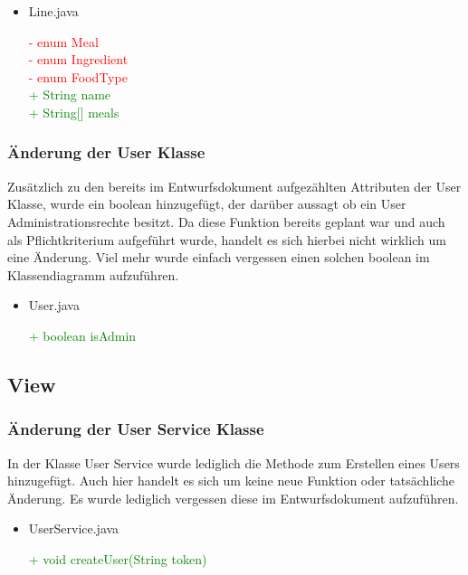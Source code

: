 \documentclass[a4paper]{scrreprt}
\begin{document}
\begin{itemize}
\item{Line.java}

\textcolor{red}{- enum Meal} \\
\textcolor{red}{- enum Ingredient} \\
\textcolor{red}{- enum FoodType} \\
\textcolor{green}{+ String name} \\
\textcolor{green}{+ String[] meals}\\
\end{itemize}

\subsubsection{Änderung der User Klasse}
Zusätzlich zu den bereits im Entwurfsdokument aufgezählten Attributen der User Klasse, wurde ein boolean hinzugefügt, der darüber aussagt ob ein User Administrationsrechte besitzt. Da diese Funktion bereits geplant war und auch als Pflichtkriterium aufgeführt wurde, handelt es sich hierbei nicht wirklich um eine Änderung. Viel mehr wurde einfach vergessen einen solchen boolean im Klassendiagramm aufzuführen.

\begin{itemize}
\item{User.java}

\textcolor{green}{+ boolean isAdmin}\\
\end{itemize}

\subsection{View}

\subsubsection{Änderung der User Service Klasse}
In der Klasse User Service wurde lediglich die Methode zum Erstellen eines Users hinzugefügt. Auch hier handelt es sich um keine neue Funktion oder tatsächliche Änderung. Es wurde lediglich vergessen diese im Entwurfsdokument aufzuführen. 

\begin{itemize}
\item{UserService.java}

\textcolor{green}{+ void createUser(String token)}\\
\end{itemize}
\end{document}
